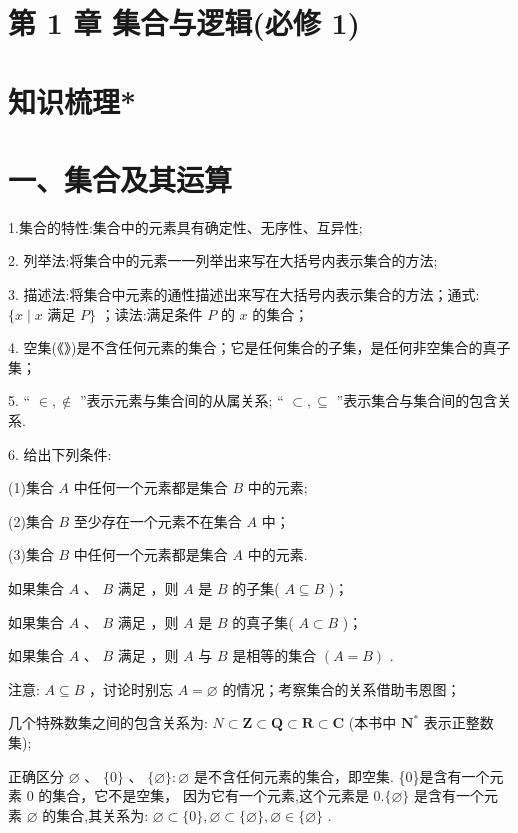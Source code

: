 \section*{第 1 章 集合与逻辑(必修 1)}

\section*{知识梳理*}

\section*{一、集合及其运算}

1.集合的特性:集合中的元素具有确定性、无序性、互异性;

2. 列举法:将集合中的元素一一列举出来写在大括号内表示集合的方法;

3. 描述法:将集合中元素的通性描述出来写在大括号内表示集合的方法；通式: $\{ x \mid  x$ 满足 $P\}$ ；读法:满足条件 $P$ 的 $x$ 的集合；

4. 空集(《》)是不含任何元素的集合；它是任何集合的子集，是任何非空集合的真子集；

5. “ $\in  , \notin$ ”表示元素与集合间的从属关系; “ $\subset  , \subseteq$ ”表示集合与集合间的包含关系.

6. 给出下列条件:

(1)集合 $A$ 中任何一个元素都是集合 $B$ 中的元素;

(2)集合 $B$ 至少存在一个元素不在集合 $A$ 中；

(3)集合 $B$ 中任何一个元素都是集合 $A$ 中的元素.

如果集合 $A$ 、 $B$ 满足  ，则 $A$ 是 $B$ 的子集( $A \subseteq  B$ )；

如果集合 $A$ 、 $B$ 满足    ，则 $A$ 是 $B$ 的真子集( $A \subset  B$ )；

如果集合 $A$ 、 $B$ 满足    ，则 $A$ 与 $B$ 是相等的集合 $\left( {A = B}\right)$ .

注意:   $A \subseteq  B$ ，讨论时别忘 $A = \varnothing$ 的情况；考察集合的关系借助韦恩图；

  几个特殊数集之间的包含关系为: ${N} \subset  \mathbf{Z} \subset  \mathbf{Q} \subset  \mathbf{R} \subset  \mathbf{C}$ (本书中 ${\mathbf{N}}^{ * }$ 表示正整数集);

  正确区分 $\varnothing \text{ 、 }\{ 0\} \text{ 、 }\{ \varnothing \}  : \varnothing$ 是不含任何元素的集合，即空集. \{0\}是含有一个元素 0 的集合，它不是空集， 因为它有一个元素,这个元素是 $0.\{ \varnothing \}$ 是含有一个元素 $\varnothing$ 的集合,其关系为: $\varnothing  \subset  \{ 0\} ,\varnothing  \subset  \{ \varnothing \} ,\varnothing  \in  \{ \varnothing \}$ .

